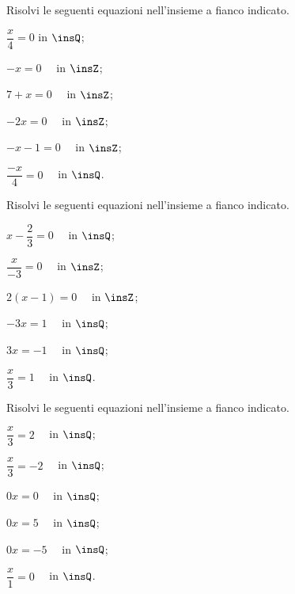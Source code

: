 \begin{esercizio}
\label{ese:15.21}
Risolvi le seguenti equazioni nell'insieme a fianco indicato.
\begin{multicols}{3}
\begin{enumeratea}
\spazielenx
 \item $\dfrac{x}{4}=0$ in $\insQ$;
 \item $-x=0\quad$ in $\insZ$;
 \item $7+x=0\quad$ in $\insZ$;
 \item $-2x=0\quad$ in $\insZ$;
 \item $-x-1=0\quad$ in $\insZ$;
 \item $\dfrac{-x}{4}=0\quad$ in $\insQ$.
\end{enumeratea}
\end{multicols}
\end{esercizio}

\begin{esercizio}
\label{ese:15.22}
Risolvi le seguenti equazioni nell'insieme a fianco indicato.
\begin{multicols}{3}
\begin{enumeratea}
\spazielenx
 \item $x-\dfrac{2}{3}=0\quad$ in $\insQ$;
 \item $\dfrac{x}{-3}=0\quad$ in $\insZ$;
 \item $2(x-1)=0\quad$ in $\insZ$;
 \item $-3x=1\quad$ in $\insQ$;
 \item $3x=-1\quad$ in $\insQ$;
 \item $\dfrac{x}{3}=1\quad$ in $\insQ$.
\end{enumeratea}
\end{multicols}
\end{esercizio}

\begin{esercizio}
\label{ese:15.23}
Risolvi le seguenti equazioni nell'insieme a fianco indicato.
\begin{multicols}{3}
\begin{enumeratea}
\spazielenx
 \item $\dfrac{x}{3}=2\quad$ in $\insQ$;
 \item $\dfrac{x}{3}=-2\quad$ in $\insQ$;
 \item $0x=0\quad$ in $\insQ$;
 \item $0x=5\quad$ in $\insQ$;
 \item $0x=-5\quad$ in $\insQ$;
 \item $\dfrac{x}{1}=0\quad$ in $\insQ$.
\end{enumeratea}
\end{multicols}
\end{esercizio}

